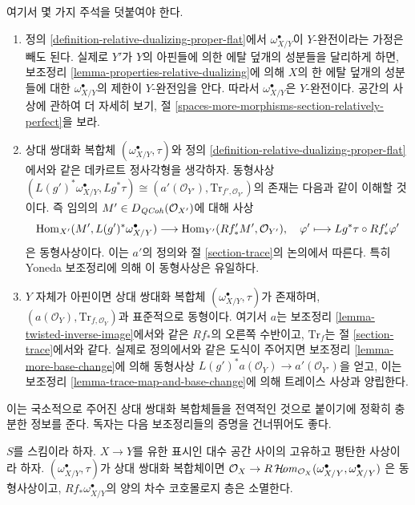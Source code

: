 \noindent
여기서 몇 가지 주석을 덧붙여야 한다.
\begin{enumerate}
\item 정의 \ref{definition-relative-dualizing-proper-flat}에서
$\omega_{X/Y}^\bullet$이 $Y$-완전이라는 가정은 빼도 된다.
실제로 $Y'$가 $Y$의 아핀들에 의한 에탈 덮개의 성분들을 달리하게
하면, 보조정리 \ref{lemma-properties-relative-dualizing}에 의해
$X$의 한 에탈 덮개의 성분들에 대한 $\omega_{X/Y}^\bullet$의 제한이
$Y$-완전임을 안다. 따라서 $\omega_{X/Y}^\bullet$은 $Y$-완전이다.
공간의 사상에 관하여 더 자세히 보기, 절
\ref{spaces-more-morphisms-section-relatively-perfect}을 보라.
\item 상대 쌍대화 복합체 $(\omega_{X/Y}^\bullet, \tau)$와 정의
\ref{definition-relative-dualizing-proper-flat}에서와 같은 데카르트
정사각형을 생각하자. 동형사상
$(L(g')^*\omega_{X/Y}^\bullet,\allowbreak Lg^*\tau) \cong
(a'(\mathcal{O}_{Y'}),\allowbreak \text{Tr}_{f', \mathcal{O}_{Y'}})$의 존재는
다음과 같이 이해할 것이다. 즉 임의의
$M' \in D_{\mathit{QCoh}}(\mathcal{O}_{X'})$에 대해 사상
$$
\mathop{\mathrm{Hom}}\nolimits_{X'}(M', L(g')^*\omega_{X/Y}^\bullet)
\longrightarrow
\mathop{\mathrm{Hom}}\nolimits_{Y'}(Rf'_*M', \mathcal{O}_{Y'}),\quad
\varphi' \longmapsto Lg^*\tau \circ Rf'_*\varphi'
$$
은 동형사상이다. 이는 $a'$의 정의와 절 \ref{section-trace}의 논의에서
따른다. 특히 Yoneda 보조정리에 의해 이 동형사상은 유일하다.
\item $Y$ 자체가 아핀이면 상대 쌍대화 복합체
$(\omega_{X/Y}^\bullet,\allowbreak \tau)$가 존재하며,
$(a(\mathcal{O}_Y),\allowbreak \text{Tr}_{f, \mathcal{O}_Y})$과 표준적으로
동형이다. 여기서 $a$는 보조정리 \ref{lemma-twisted-inverse-image}에서와
같은 $Rf_*$의 오른쪽 수반이고, $\text{Tr}_f$는 절
\ref{section-trace}에서와 같다. 실제로 정의에서와 같은 도식이 주어지면
보조정리 \ref{lemma-more-base-change}에 의해 동형사상
$L(g')^*a(\mathcal{O}_Y) \to a'(\mathcal{O}_{Y'})$을 얻고, 이는
보조정리 \ref{lemma-trace-map-and-base-change}에 의해 트레이스 사상과
양립한다.
\end{enumerate}
이는 국소적으로 주어진 상대 쌍대화 복합체들을 전역적인 것으로
붙이기에 정확히 충분한 정보를 준다. 독자는 다음 보조정리들의 증명을
건너뛰어도 좋다.

\begin{lemma}
\label{lemma-relative-dualizing-RHom}
$S$를 스킴이라 하자. $X \to Y$를 유한 표시인 대수 공간 사이의
고유하고 평탄한 사상이라 하자. $(\omega_{X/Y}^\bullet, \tau)$가
상대 쌍대화 복합체이면
$\mathcal{O}_X \to
R\mathop{\mathcal{H}\!\mathit{om}}\nolimits_{\mathcal{O}_X}(\omega_{X/Y}^\bullet, \omega_{X/Y}^\bullet)$
은 동형사상이고, $Rf_*\omega_{X/Y}^\bullet$의 양의 차수 코호몰로지
층은 소멸한다.
\end{lemma}

